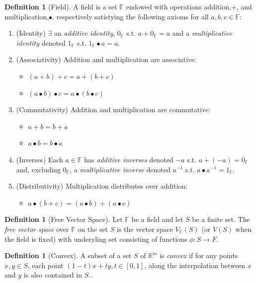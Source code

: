 \documentclass[ma]{uncgdissertationexp}
\theoremstyle{plain}
\theoremstyle{definition}
\newtheorem{definition}[theorem]{Definition}
\theoremstyle{remark}
\begin{document}
\begin{definition}[Field]
A field is a set $\mathbb{F}$ endowed with operations addition,$+$, and multiplication,$\bullet$, respectively satistying the following axioms for all $a,b,c\in\mathbb{F}$:
\begin{enumerate}
\item (Identity) $\exists$ an \textit{additive identity}, $0_{\mathbb{F}}$ s.t. $a+0_{\mathbb{F}}=a$ and a \textit{multiplicative identity} denoted $1_{\mathbb{F}}$ s.t. $1_{\mathbb{F}}\bullet a = a$.
\item (Associativity) Addition and multiplication are associative:
\begin{itemize}
\item $(a+b) + c = a + (b+c)$
\item $(a\bullet b) \bullet c = a \bullet (b \bullet c)$
\end{itemize}
\item (Commutativity) Addition and multiplication are commutative:
\begin{itemize}
\item $a + b = b + a$
\item $a \bullet b = b \bullet a$
\end{itemize}
\item (Inverses) Each $a \in \mathbb{F}$ has \textit{additive inverses} denoted $-a$ s.t. $a + (-a) = 0_{\mathbb{F}}$ and, excluding $0_\mathbb{F}$, a \textit{multiplicative inverse} denoted $a^{-1}$ s.t. $a \bullet a^{-1}=1_\mathbb{F}$.
\item (Distributivity) Multiplication distributes over addition:
\begin{itemize}
\item $a \bullet (b+c) = (a \bullet b) + (a \bullet c)$
\end{itemize}
\end{enumerate}
\end{definition}

\begin{definition}[Free Vector Space]
Let $\mathbb{F}$ be a field and let $S$ be a finite set. The \textit{free vector space} over $\mathbb{F}$ on the set $S$ is the vector space $V_{\mathbb{F}}(S)$ (or $V(S)$ when the field is fixed) with underyling set consisting of functions $\phi: S \rightarrow F$.
\end{definition}

\begin{definition}[Convex]
A subset of a set $S$ of $\mathbb{R}^m$ is \textit{convex} if for any points $x, y \in S$, each point $(1-t)x+ty, t\in [0,1]$, along the interpolation between $x$ and $y$ is also contained in $S$..
\end{definition}
\end{document}
